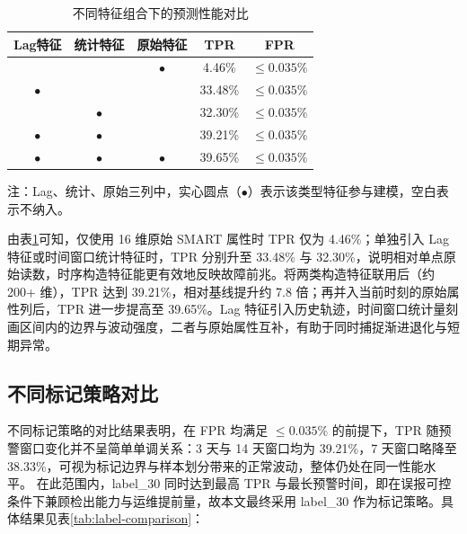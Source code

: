 \begin{table}[htbp]
    \centering
    \caption{\label{tab:feature-engineering}不同特征组合下的预测性能对比}
    \begin{tabular*}{0.88\linewidth}{@{\extracolsep{\fill}}ccccc@{}}
        \toprule
        Lag特征 & 统计特征 & 原始特征 & TPR & FPR \\
        \midrule
        & & $\bullet$ & 4.46\% & $\leq 0.035\%$ \\
        $\bullet$ & & & 33.48\% & $\leq 0.035\%$ \\
        & $\bullet$ & & 32.30\% & $\leq 0.035\%$ \\
        $\bullet$ & $\bullet$ & & 39.21\% & $\leq 0.035\%$ \\
        $\bullet$ & $\bullet$ & $\bullet$ & 39.65\% & $\leq 0.035\%$ \\
        \bottomrule
    \end{tabular*}
    
    \vspace{2pt}
    \begin{minipage}{0.88\linewidth}
        \footnotesize 注：Lag、统计、原始三列中，实心圆点（$\bullet$）表示该类型特征参与建模，空白表示不纳入。
    \end{minipage}
\end{table}

由表\ref{tab:feature-engineering}可知，仅使用 16 维原始 SMART 属性时 TPR 仅为 4.46\%；单独引入 Lag 特征或时间窗口统计特征时，TPR 分别升至 33.48\% 与 32.30\%，说明相对单点原始读数，时序构造特征能更有效地反映故障前兆。将两类构造特征联用后（约 200+ 维），TPR 达到 39.21\%，相对基线提升约 7.8 倍；再并入当前时刻的原始属性列后，TPR 进一步提高至 39.65\%。Lag 特征引入历史轨迹，时间窗口统计量刻画区间内的边界与波动强度，二者与原始属性互补，有助于同时捕捉渐进退化与短期异常。

\subsection{不同标记策略对比}

不同标记策略的对比结果表明，在 FPR 均满足 $\leq 0.035\%$ 的前提下，TPR 随预警窗口变化并不呈简单单调关系：3 天与 14 天窗口均为 39.21\%，7 天窗口略降至 38.33\%，可视为标记边界与样本划分带来的正常波动，整体仍处在同一性能水平。
在此范围内，label\_30 同时达到最高 TPR 与最长预警时间，即在误报可控条件下兼顾检出能力与运维提前量，故本文最终采用 label\_30 作为标记策略。具体结果见表\ref{tab:label-comparison}：

